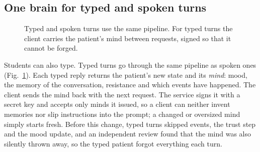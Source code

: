 \documentclass[journal]{IEEEtran}
\begin{document}
\subsection{One brain for typed and spoken turns}\label{p2:sec:paths}

\begin{figure}[t]
\centering
{}
\caption{Typed and spoken turns use the same pipeline. For typed turns the client carries the patient's mind between requests, signed so that
it cannot be forged.}
\label{p2:fig:paths}
\end{figure}

Students can also type. Typed turns go through the same pipeline as spoken ones (Fig.~\ref{p2:fig:paths}). Each typed reply returns the patient's new
state and its \emph{mind}: mood, the memory of the conversation, resistance and which events have happened. The client sends the mind back with
the next request. The service signs it with a secret key and accepts only minds it issued, so a client can neither invent memories nor slip
instructions into the prompt; a changed or oversized mind simply starts fresh. Before this change, typed turns skipped events, the trust step and
the mood update, and an independent review found that the mind was also silently thrown away, so the typed patient forgot everything each turn.
\end{document}
